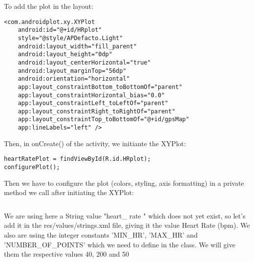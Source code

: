 \documentclass[11pt]{article}
\begin{document}
To add the plot in the layout:
\begin{lstlisting}
<com.androidplot.xy.XYPlot
    android:id="@+id/HRplot"
    style="@style/APDefacto.Light"
    android:layout_width="fill_parent"
    android:layout_height="0dp"
    android:layout_centerHorizontal="true"
    android:layout_marginTop="56dp"
    android:orientation="horizontal"
    app:layout_constraintBottom_toBottomOf="parent"
    app:layout_constraintHorizontal_bias="0.0"
    app:layout_constraintLeft_toLeftOf="parent"
    app:layout_constraintRight_toRightOf="parent"
    app:layout_constraintTop_toBottomOf="@+id/gpsMap"
    app:lineLabels="left" />
\end{lstlisting}
Then, in onCreate() of the activity, we initiante the XYPlot:
\begin{lstlisting}
heartRatePlot = findViewById(R.id.HRplot);
configurePlot();
\end{lstlisting}
Then we have to configure the plot (colors, styling, axis formatting) in a private method we call after initiating the XYPlot:
\begin{lstlisting}

\end{lstlisting}
We are using here a String value "heart\_ rate " which does not yet exist, so let’s add it in the res/values/strings.xml file, giving it the value Heart Rate (bpm). We also are using the integer constants 'MIN\_HR', 'MAX\_HR' and 'NUMBER\_OF\_POINTS' which we need to define in the class. We will give them the respective values 40, 200 and 50
\end{document}

